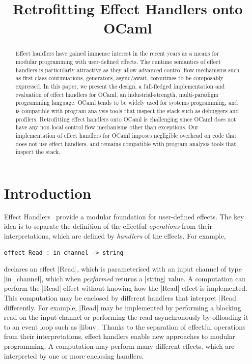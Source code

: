 \documentclass[sigplan,10pt,review,anonymous]{acmart}\settopmatter{printfolios=true,printccs=false,printacmref=false}
\begin{document}
\title{Retrofitting Effect Handlers onto OCaml}

\begin{abstract}
	Effect handlers have gained immense interest in the recent years as a means
	for modular programming with user-defined effects. The runtime semantics of
	effect handlers is particularly attractive as they allow advanced control
	flow mechanisms such as first-class continuations, generators, async/await,
	coroutines to be composably expressed. In this paper, we present the design,
	a full-fledged implementation and evaluation of effect handlers for OCaml, an
	industrial-strength, multi-paradigm programming language. OCaml tends to be
	widely used for systems programming, and is compatible with program analysis
	tools that inspect the stack such as debuggers and profilers. Retrofitting
	effect handlers onto OCaml is challenging since OCaml does not have any
	non-local control flow mechanisms other than exceptions. Our implementation
	of effect handlers for OCaml imposes negligible overhead on code that does
	not use effect handlers, and remains compatible with program analysis tools
	that inspect the stack.
\end{abstract}

\maketitle

\section{Introduction}

Effect Handlers~\cite{Plotkin09} provide a modular foundation for user-defined
effects. The key idea is to separate the definition of the effectful
\emph{operations} from their interpretations, which are defined by
\emph{handlers} of the effects. For example,
%
\begin{lstlisting}
effect Read : in_channel -> string
\end{lstlisting}
%
declares an effect |Read|, which is parameterised with an input channel of type
|in_channel|, which when \emph{performed} returns a |string| value. A
computation can perform the |Read| effect without knowing how the |Read| effect
is implemented. This computation may be enclosed by different handlers that
interpret |Read| differently. For example, |Read| may be implemented by
performing a blocking read on the input channel or performing the read
asynchronously by offloading it to an event loop such as |libuv|. Thanks to the
separation of effectful operations from their interpretations, effect handlers
enable new approaches to modular programming. A computation may perform many
different effects, which are interpreted by one or more enclosing handlers.
\end{document}
